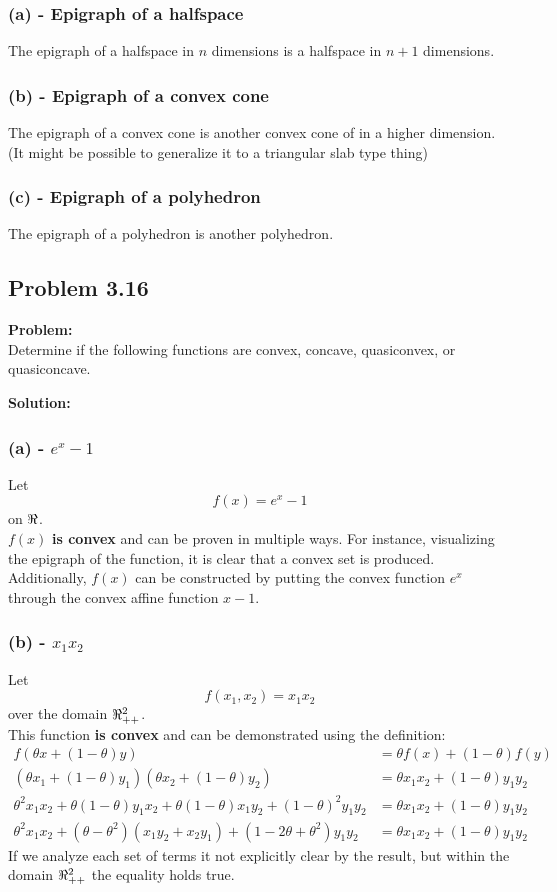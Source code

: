 \documentclass[letter]{article}
\begin{document}
\subsubsection{(a) - Epigraph of a halfspace}
The epigraph of a halfspace in $n$ dimensions is a halfspace in $n+1$ dimensions.

\subsubsection{(b) - Epigraph of a convex cone}
The epigraph of a convex cone is another convex cone of in a higher dimension. (It might be possible to generalize it to a triangular slab type thing)

\subsubsection{(c) - Epigraph of a polyhedron}
The epigraph of a polyhedron is another polyhedron.

\newpage
\subsection{Problem 3.16}
\textbf{Problem:}\\
Determine if the following functions are convex, concave, quasiconvex, or quasiconcave.

\noindent
\textbf{Solution:}\\
\subsubsection{(a) - $e^x - 1$}
Let $$f(x) = e^x - 1$$ on $\real$.\\
$f(x)$ \textbf{is convex} and can be proven in multiple ways. For instance, visualizing the epigraph of the function, it is clear that a convex set is produced. Additionally, $f(x)$ can be constructed by putting the convex function $e^x$ through the convex affine function $x - 1$.

\subsubsection{(b) - $x_1 x_2$}
Let $$f(x_1,x_2) = x_1 x_2$$ over the domain $\real_{++}^2$.\\
This function \textbf{is convex} and can be demonstrated using the definition:
\begin{align}
	f(\theta x + (1-\theta)y) &= \theta f(x) + (1-\theta) f(y)\\
	 (\theta x_1 + (1-\theta) y_1) (\theta x_2 + (1-\theta) y_2)&= \theta x_1 x_2 + (1- \theta) y_1 y_2\nonumber\\
	\theta^2 x_1 x_2 + \theta(1-\theta)y_1 x_2 + \theta (1-\theta) x_1 y_2 + (1-\theta)^2 y_1 y_2 &= \theta x_1 x_2 + (1- \theta) y_1 y_2\nonumber\\
	\theta^2 x_1 x_2 + (\theta-\theta^2) (x_1 y_2 + x_2 y_1) + (1- 2 \theta + \theta^2) y_1 y_2 &= \theta x_1 x_2 + (1- \theta) y_1 y_2
\end{align}
If we analyze each set of terms it not explicitly clear by the result, but within the domain $\real_{++}^2$ the equality holds true.
\end{document}
